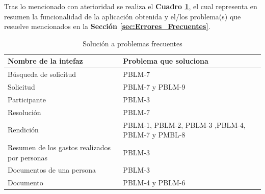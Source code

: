     \vspace{10mm}
    Tras lo mencionado con aterioridad se realiza el \textbf{Cuadro \ref{tab: Solucion_Problemas_Frecuentes}}, el cual representa en resumen la funcionalidad de la aplicación obtenida y el/los problema(s) que resuelve mencionados en la  \textbf{Sección \ref{sec:Errores_Frecuentes}}.


    \begin{table}[htbp]
        \centering
        \caption{Solución a problemas frecuentes}
        \label{tab: Solucion_Problemas_Frecuentes}
        \begin{tabular}{| p{7cm}| p{7.4cm} |}
        \hline
        \textbf{Nombre de la intefaz} & \textbf{Problema que soluciona} \\
        \hline \hline

        Búsqueda de solicitud & PBLM-7 \\ \hline

        Solicitud & PBLM-7 y PBLM-9\\ \hline

        Participante & PBLM-3 \\ \hline

        Resolución & PBLM-7 \\ \hline

        Rendición & PBLM-1, PBLM-2, PBLM-3 ,PBLM-4, PBLM-7 y PMBL-8 \\ \hline

        Resumen de los gastos realizados por personas & PBLM-3\\ \hline

        Documentos de una persona & PBLM-3\\ \hline

        Documento & PBLM-4 y PBLM-6\\ \hline
        \end{tabular}
    \end{table}

